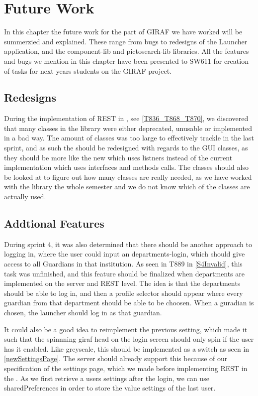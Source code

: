 \chapter{Future Work}
In this chapter the future work for the part of GIRAF we have worked will be
summerzied and explained. These range from bugs to redesigns of the Launcher
application, and the component-lib and pictosearch-lib libraries.
All the features and bugs we mention in this chapter have been presented to
SW611 for creation of tasks for next years students on the GIRAF project.

\section{Redesigns}
During the implementation of REST in , see
\autoref{T836_T868_T870}, we discovered that many classes in the library were
either deprecated, unusable or implemented in a bad way. The amount of classes
was too large to effectively trackle in the last sprint, and as such the
 should be redesigned with regards to the GUI classes, as
they should be more like the new  which uses listners
instead of the current implementation which uses interfaces and methods calls.
The classes should also be looked at to figure out how many classes are really
needed, as we have worked with the library the whole semester and we do not
know which of the classes are actually used.

\section{Addtional Features}
During sprint 4, it was also determined that there should be another
approach to logging in, where the user could input an departments-login, which
should give access to all Guardians in that institution. As seen in T889 in
\autoref{S4Invalid}, this task was unfinished, and this feature should be
finalized when departments are implemented on the server and REST level. The
idea is that the departments should be able to log in, and then a profile
selector should appear where every guardian from that department should be able
to be choosen. When a guradian is chosen, the launcher should log in as that
guardian.\nl

It could also be a good idea to reimplement the previous setting, which made it
such that the spinnning giraf head on the login screen should only spin if the
user has it enabled. Like greyscale, this should be implemented as a switch as
seen in \autoref{newSettingsPage}. The server should already support this
because of our specification of the settings page, which we made before
implementing REST in the . As we first retrieve a users settings
after the login, we can use sharedPreferences in order to store the value
settings of the last user.

